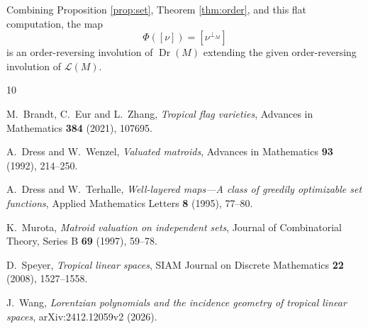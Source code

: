 \documentclass[12pt]{article}
\newcommand{\cL}{\mathcal L}
\newcommand{\Dr}{\operatorname{Dr}}
\begin{document}
Combining Proposition \ref{prop:set}, Theorem \ref{thm:order}, and this
flat computation, the map
\[
        \Phi([\nu])=[\nu^{\perp_M}]
\]
is an order-reversing involution of $\Dr(M)$ extending the given
order-reversing involution of $\cL(M)$.

\begin{thebibliography}{10}

M.~Brandt, C.~Eur and L.~Zhang,
\emph{Tropical flag varieties},
Advances in Mathematics \textbf{384} (2021), 107695.

A.~Dress and W.~Wenzel,
\emph{Valuated matroids},
Advances in Mathematics \textbf{93} (1992), 214--250.

A.~Dress and W.~Terhalle,
\emph{Well-layered maps---A class of greedily optimizable set functions},
Applied Mathematics Letters \textbf{8} (1995), 77--80.

K.~Murota,
\emph{Matroid valuation on independent sets},
Journal of Combinatorial Theory, Series B \textbf{69} (1997), 59--78.

D.~Speyer,
\emph{Tropical linear spaces},
SIAM Journal on Discrete Mathematics \textbf{22} (2008), 1527--1558.

J.~Wang,
\emph{Lorentzian polynomials and the incidence geometry of tropical
linear spaces},
arXiv:2412.12059v2 (2026).

\end{thebibliography}
\end{document}
